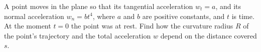 
\item A point moves in the plane so that its tangential acceleration \( w_t = a \), and its normal acceleration \( w_n = bt^4 \), where \( a \) and \( b \) are positive constants, and \( t \) is time. At the moment \( t = 0 \) the point was at rest. Find how the curvature radius \( R \) of the point's trajectory and the total acceleration \( w \) depend on the distance covered \( s \).
